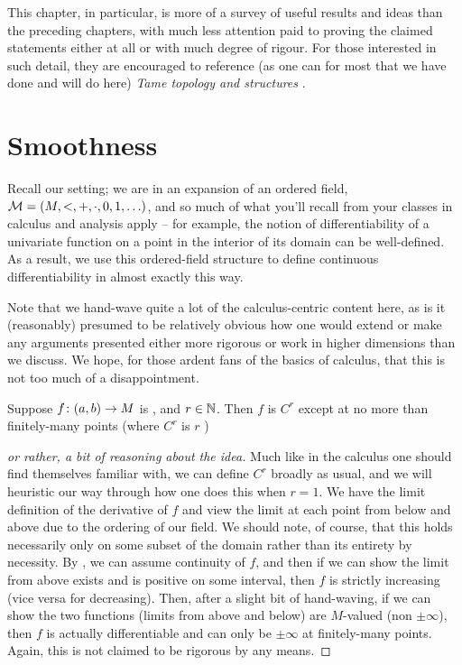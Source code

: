 \medskip

This chapter, in particular, is more of a survey of useful results and ideas than the preceding chapters, with much less attention paid to proving the claimed statements either at all or with much degree of rigour. For those interested in such detail, they are encouraged to reference (as one can for most that we have done and will do here) \emph{Tame topology and \Om structures} \cite{dries_tame_1998}.

\section{Smoothness}
Recall our setting; we are in an \om expansion of an ordered field, $\mathcal{M} = (M, <, +, \cdot, 0, 1, \hdots)$, and so much of what you'll recall from your classes in calculus and analysis apply -- for example, the notion of differentiability of a univariate function on a point in the interior of its domain can be well-defined. As a result, we use this ordered-field structure to define continuous differentiability in almost exactly this way.

\newpage

\begin{svgraybox}
  Note that we hand-wave quite a lot of the calculus-centric content here, as is it (reasonably) presumed to be relatively obvious how one would extend or make any arguments presented either more rigorous or work in higher dimensions than we discuss. We hope, for those ardent fans of the basics of calculus, that this is not too much of a disappointment.
\end{svgraybox}


\begin{theorem}
  Suppose $f \colon (a, b) \to M$ is , and $r \in \mathbb{N}$. Then $f$ is $C^{r}$ except at no more than finitely-many points (where $C^r$ is $r$ \contdfblty)
  \label{thm:cont_diff}
\end{theorem}

\begin{proof}[or rather, a bit of reasoning about the idea]
Much like in the calculus one should find themselves familiar with, we can define $C^r$ broadly as usual, and we will heuristic our way through how one does this when $r=1$. We have the limit definition of the derivative of $f$ and view the limit at each point from below and above due to the ordering of our field. We should note, of course, that this holds necessarily only on some subset of the domain rather than its entirety by necessity. By \Mt, we can assume continuity of $f$, and then if we can show the limit from above exists and is positive on some interval, then $f$ is strictly increasing (vice versa for decreasing). Then, after a slight bit of hand-waving, if we can show the two functions (limits from above and below) are $M$-valued (non $\pm \infty$), then $f$ is actually differentiable and can only be $\pm \infty$ at finitely-many points. Again, this is not claimed to be rigorous by any means.
\end{proof}

